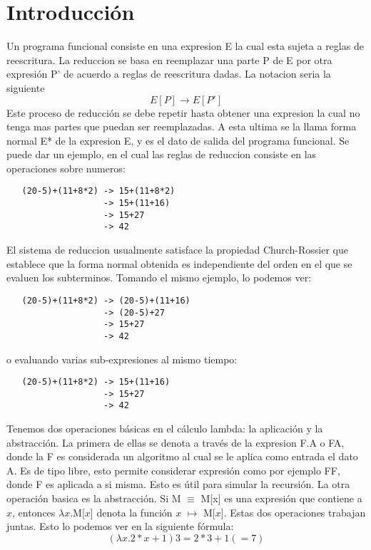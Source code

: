 \section{Introducción}

Un programa funcional consiste en una expresion E la cual esta sujeta a reglas de reescritura. La reduccion se basa en reemplazar una parte P de E por otra expresión P' de acuerdo a reglas de reescritura dadas. La notacion seria la siguiente
\[ E[P] \rightarrow E[P'] \]
Este proceso de reducción se debe repetir hasta obtener una expresion la cual no tenga mas partes que puedan ser reemplazadas. A esta ultima se la llama forma normal E* de la expresion E, y es el dato de salida del programa funcional.
Se puede dar un ejemplo, en el cual las reglas de reduccion consiste en las operaciones sobre numeros:

\begin{lstlisting}
   (20-5)+(11+8*2) -> 15+(11+8*2)
                   -> 15+(11+16)
                   -> 15+27
                   -> 42
\end{lstlisting}
El sistema de reduccion usualmente satisface la propiedad Church-Rossier que establece que la forma normal obtenida es independiente del orden en el que se evaluen los subterminos. Tomando el mismo ejemplo, lo podemos ver:
\begin{lstlisting}
   (20-5)+(11+8*2) -> (20-5)+(11+16)
                   -> (20-5)+27
                   -> 15+27
                   -> 42
\end{lstlisting}

o evaluando varias sub-expresiones al mismo tiempo:

\begin{lstlisting}
   (20-5)+(11+8*2) -> 15+(11+16)
                   -> 15+27
                   -> 42
 \end{lstlisting}

 Tenemos dos operaciones básicas en el cálculo lambda: la aplicación y la abstracción.
 La primera de ellas se denota a través de la expresion F.A o FA, donde la F es considerada un algoritmo al cual se le aplica como entrada el dato A. Es de tipo libre, esto permite considerar expresión como por ejemplo FF, donde F es aplicada a si misma. Esto es útil para simular la recursión.
 La otra operación basica es la abstracción. Si M $\equiv$ M[x] es una expresión que contiene a $x$, entonces $\lambda$$x$.M[$x$] denota la función $x$ $\mapsto$ M[$x$].
 Estas dos operaciones trabajan juntas. Esto lo podemos ver en la siguiente fórmula:
 \[ (\lambda x.2*x+1)3=2*3+1 (=7) \]


